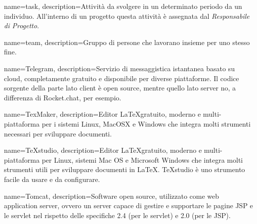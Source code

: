 

{
	name=task,
	description={Attività da svolgere in un determinato periodo da un individuo. All'interno di un progetto questa attività è assegnata dal \textit{Responsabile di Progetto}.}
}

{
	name=team,
	description={Gruppo di persone che lavorano insieme per uno stesso fine.}
}

{
	name=Telegram,
	description={Servizio di messaggistica istantanea basato su cloud, completamente gratuito e disponibile per diverse piattaforme. Il codice sorgente della parte lato client è open source, mentre quello lato server no, a differenza di Rocket.chat, per esempio.}
}

{
	name=TexMaker,
	description={Editor \LaTeX gratuito, moderno e multi-piattaforma per i sistemi Linux, MacOSX e Windows che integra molti strumenti necessari per sviluppare documenti.}
}

{
	name=TeXstudio,
	description={Editor \LaTeX gratuito, moderno e multi-piattaforma per Linux, sistemi Mac OS e Microsoft Windows che integra molti strumenti utili per sviluppare documenti in \LaTeX. TeXstudio è uno strumento facile da usare e da configurare.}
}

{
	name=Tomcat,
	description={Software open source, utilizzato come web application server, ovvero un server capace di gestire e supportare le pagine JSP e le servlet nel rispetto delle specifiche 2.4 (per le servlet) e 2.0 (per le JSP).}
}



